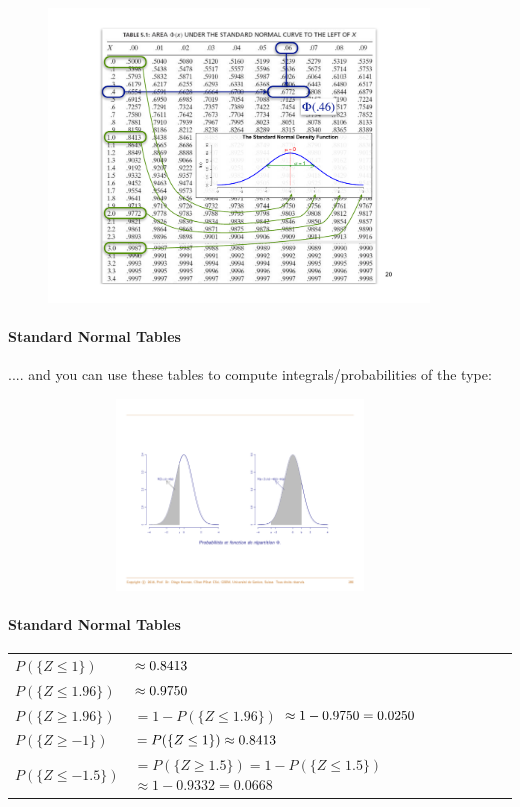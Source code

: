 \documentclass[notes=show,smaller]{beamer}\usepackage[]{graphicx}\usepackage[]{color}
\begin{document}
  \begin{frame}{\subsecname}
  \begin{figure}[ptb]\centering
  \includegraphics[width=0.9\textwidth,height=0.95\textheight]{img/myTableGauss.pdf}%
  \end{figure}
\end{frame}

\begin{frame}{\subsecname}
\framesubtitle{Standard Normal Tables}
  .... and you can use these tables to compute integrals/probabilities of the type:
  \begin{figure}[ptb]\centering
  \includegraphics[height=2in, width=4in]{img/CDF_pr.pdf}%
  \end{figure}%
  \end{frame}%

  \begin{frame}{\subsecname}
  \framesubtitle{Standard Normal Tables}

  \begin{example}[Prob of $Z$]


  \noindent
  \begin{tabular}{ll}
  $P(\{Z\leq 1\})$ & $\approx0.8413\bigskip $ \\
  $P(\{Z\leq 1.96\})$ & $\approx0.9750\bigskip $ \\
  $P(\{Z\geq 1.96\})$ & $=1-P(\{Z\leq 1.96\})$ $\approx1-0.9750=0.0250\bigskip $\\
  $P(\{Z\geq -1\})$ & $=P(\{Z\leq 1\})\approx0.8413\bigskip $ \\
  $P(\{Z\leq -1.5\})$ & $=P(\{Z\geq 1.5\}) =1-P(\{Z\leq 1.5\})$ $\approx1-0.9332=0.0668$%
  \end{tabular}

  \end{example}
\end{frame}
\end{document}
